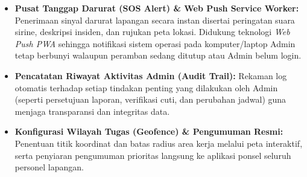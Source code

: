 \documentclass[11pt,a4paper]{article}
\begin{document}
\begin{itemize}
    \item \textbf{Pusat Tanggap Darurat (SOS Alert) \& Web Push Service Worker:} Penerimaan sinyal darurat lapangan secara instan disertai peringatan suara sirine, deskripsi insiden, dan rujukan peta lokasi. Didukung teknologi \textit{Web Push PWA} sehingga notifikasi sistem operasi pada komputer/laptop Admin tetap berbunyi walaupun peramban sedang ditutup atau Admin belum login.
    \item \textbf{Pencatatan Riwayat Aktivitas Admin (Audit Trail):} Rekaman log otomatis terhadap setiap tindakan penting yang dilakukan oleh Admin (seperti persetujuan laporan, verifikasi cuti, dan perubahan jadwal) guna menjaga transparansi dan integritas data.
    \item \textbf{Konfigurasi Wilayah Tugas (Geofence) \& Pengumuman Resmi:} Penentuan titik koordinat dan batas radius area kerja melalui peta interaktif, serta penyiaran pengumuman prioritas langsung ke aplikasi ponsel seluruh personel lapangan.
\end{itemize}
\end{document}

